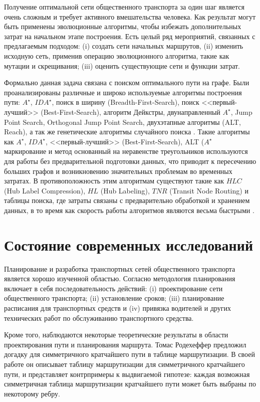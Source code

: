 Получение оптимальной сети общественного транспорта за один шаг является очень сложным и требует активного 
вмешательства человека. Как результат могут быть применены эволюционные алгоритмы, чтобы избежать 
дополнительных затрат на начальном этапе построения. Есть целый ряд мероприятий, связанных с предлагаемым 
подходом: (i) создать сети начальных маршрутов, (ii) изменить исходную сеть, применив операцию эволюционного 
алгоритма, такие как мутации и скрещивания; (iii) оценить существующие сети и функции затрат.

Формально данная задача связана с поиском оптимального пути на графе. Были проанализированы различные и 
широко используемые алгоритмы построения пути: \( A^\star \), \( IDA^\star \), поиск в ширину 
(Breadth-First-Search), поиск <<первый-лучший>> (Best-First-Search), алгоритм Дейкстры, двунаправленный 
\( A^\star \), Jump Point Search, Orthogonal Jump Point Search, двухэтапные алгоритмы (ALT, Reach), а 
так же генетические алгоритмы случайного поиска \cite{bib:19}.  Такие алгоритмы как \( A^\star \), 
\( IDA^\star \), <<первый-лучший>> (Best-First-Search), ALT (\( A^\star \) маркирование и метод основанный на 
неравенстве треугольников используются для работы без предварительной подготовки данных, что приводит к 
пересечению больших графов и возникновению значительных проблемам во временных затратах. В противоположность 
этим алгоритмам существуют такие как \( HLC \) (Hub Label Compression), \( HL \) (Hub Labeling), 
\( TNR \) (Transit Node Routing) и таблицы поиска, где затраты связаны с предварительно обработкой и 
хранением данных, в то время как скорость работы алгоритмов являются весьма быстрыми \cite{bib:21}.

\section{Состояние современных исследований}
Планирование и разработка транспортных сетей общественного транспорта является хорошо изученной областью.
Согласно \cite{ceder2007} методология планирования включает в себя последовательность действий: 
(i) проектирование сети общественного транспорта; (ii) установление сроков; (iii) планирование расписания 
для транспортных средств и (iv) привязка водителей и других технических работ по обслуживанию транспортного 
средства.

Кроме того, наблюдаются некоторые теоретические результаты в области проектирования пути и планирования 
маршрута. Томас Родехеффер предложил догадку для симметричного кратчайшего пути в таблице маршрутизации. 
В своей работе \cite{rodeheffer2013symmetric} он описывает таблицу маршрутизации для симметричного кратчайшего 
пути, и представляет контрпримеры к выдвигаемой гипотезе: каждая возможная симметричная таблица маршрутизации 
кратчайшего пути может быть выбраны по некоторому ребру.

